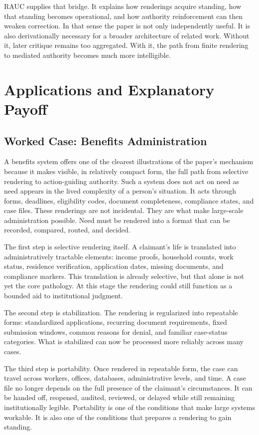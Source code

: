 \documentclass[11pt]{article}
\begin{document}
RAUC supplies that bridge. It explains how renderings acquire standing, how that standing becomes operational, and how authority reinforcement can then weaken correction. In that sense the paper is not only independently useful. It is also derivationally necessary for a broader architecture of related work. Without it, later critique remains too aggregated. With it, the path from finite rendering to mediated authority becomes much more intelligible.
\section{Applications and Explanatory Payoff}

\subsection{Worked Case: Benefits Administration}

A benefits system offers one of the clearest illustrations of the paper's mechanism because it makes visible, in relatively compact form, the full path from selective rendering to action-guiding authority. Such a system does not act on need as need appears in the lived complexity of a person's situation. It acts through forms, deadlines, eligibility codes, document completeness, compliance states, and case files. These renderings are not incidental. They are what make large-scale administration possible. Need must be rendered into a format that can be recorded, compared, routed, and decided.\cite{MoynihanHerdHarvey2015AdministrativeBurden,Eubanks2018AutomatingInequality,Lipsky1980StreetLevelBureaucracy,Scott1998SeeingLikeState}

The first step is selective rendering itself. A claimant's life is translated into administratively tractable elements: income proofs, household counts, work status, residence verification, application dates, missing documents, and compliance markers. This translation is already selective, but that alone is not yet the core pathology. At this stage the rendering could still function as a bounded aid to institutional judgment.

The second step is stabilization. The rendering is regularized into repeatable forms: standardized applications, recurring document requirements, fixed submission windows, common reasons for denial, and familiar case-status categories. What is stabilized can now be processed more reliably across many cases.

The third step is portability. Once rendered in repeatable form, the case can travel across workers, offices, databases, administrative levels, and time. A case file no longer depends on the full presence of the claimant's circumstances. It can be handed off, reopened, audited, reviewed, or delayed while still remaining institutionally legible. Portability is one of the conditions that make large systems workable. It is also one of the conditions that prepares a rendering to gain standing.\cite{Lipsky1980StreetLevelBureaucracy,Scott1998SeeingLikeState}
\end{document}
